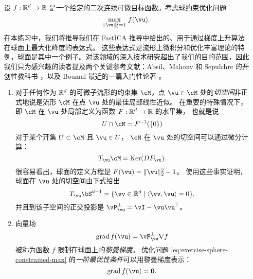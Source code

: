 \documentclass[../../book-main.tex]{subfiles}
\begin{document}
\begin{exercise}\label{exercise:sphere-calculus}
    设 $f : \mathbb{R}^d \to \mathbb{R}$ 是一个给定的二次连续可微目标函数。考虑球约束优化问题
    \begin{equation}\label{eq:exercise-sphere-constrained-max}
        \max_{\norm{\vu}_2^2 = 1}\, f(\vu). 
    \end{equation}
    在本练习中，我们将推导我们在 FastICA 推导中给出的、用于通过梯度上升算法在球面上最大化峰度的表达式。
    这些表达式是流形上微积分和优化丰富理论的特例，球面是其中一个例子。对该领域的深入技术研究超出了我们的目的范围，因此我们只为感兴趣的读者提及两个关键参考文献：Absil、Mahony 和 Sepulchre 的开创性教科书
    \cite{Absil2009-nc}，以及 Boumal 最近的一篇入门性论著 \cite{Boumal2023-rj}。
    \begin{enumerate}
        \item 对于任何作为 $\mathbb{R}^d$ 的可微子流形的约束集 $\cM$，点 $\vu \in \cM$ 处的\textit{切空间}非正式地说是流形 $\cM$ 在点 $\vu$ 处的最佳局部线性近似。
        在重要的特殊情况下，即 $\cM$ 在 $\vu$ 处局部定义为函数 $F : \mathbb{R}^d \to \mathbb{R}$ 的水平集，
        也就是说
        \begin{equation*}
            U \cap \cM = F^{-1}(\set{0})
        \end{equation*}
        对于某个开集 $U \subset \cM$ 且 $\vu \in U$，
        $\cM$ 在 $\vu$ 处的切空间可以通过微分计算：
        \begin{equation*}
            T_{\vu} \cM = \Ker(DF_{\vu}).
        \end{equation*}
        很容易看出，球面的定义方程是 $F(\vu) = \norm{\vu}_2^2 - 1$。
        使用这些事实证明，球面在 $\vu$ 处的切空间由下式给出
        \begin{equation*}
            T_{\vu} \bS^{d-1} = \set{\vv \in \R^d \given \ip{\vv}{\vu} = 0},
        \end{equation*}
        并且到该子空间的正交投影是 $\vP_{\vu}^\perp = \vI - \vu\vu^\top$。
        \item 向量场
        \begin{equation}\label{eq:exercise-riemann-grad-sphere}
        \mathrm{grad}\, f(\vu) = \vP_{\vu}^\perp \nabla f
        \end{equation}
        被称为函数 $f$ 限制在球面上的\textit{黎曼梯度}。
        优化问题 \eqref{eq:exercise-sphere-constrained-max} 的\textit{一阶最优性条件}可以用黎曼梯度表示：
        \begin{equation*}
            \mathrm{grad}\, f(\vu) = \mathbf{0}.
        \end{equation*}

\end{enumerate}
\end{exercise}
\end{document}
